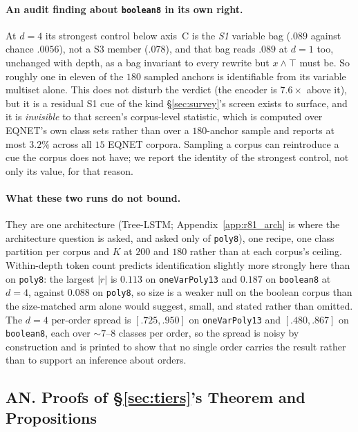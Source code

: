 \paragraph{An audit finding about \texttt{boolean8} in its own right.} At $d{=}4$ its strongest control below axis~C is the \emph{S1} variable bag ($.089$ against chance $.0056$), not a S3 member ($.078$), and that bag reads $.089$ at $d{=}1$ too, unchanged with depth, as a bag invariant to every rewrite but $x{\wedge}\top$ must be. So roughly one in eleven of the $180$ sampled anchors is identifiable from its variable multiset alone. This does not disturb the verdict (the encoder is $7.6\times$ above it), but it is a residual S1 cue of the kind \S\ref{sec:survey}'s screen exists to surface, and it is \emph{invisible} to that screen's corpus-level statistic, which is computed over EQNET's own class sets rather than over a $180$-anchor sample and reports at most $3.2\%$ across all $15$ EQNET corpora. Sampling a corpus can reintroduce a cue the corpus does not have; we report the identity of the strongest control, not only its value, for that reason.

\paragraph{What these two runs do not bound.} They are one architecture (Tree-LSTM; Appendix~\ref{app:r81_arch} is where the architecture question is asked, and asked only of \texttt{poly8}), one recipe, one class partition per corpus and $K$ at $200$ and $180$ rather than at each corpus's ceiling. Within-depth token count predicts identification slightly more strongly here than on \texttt{poly8}: the largest $|r|$ is $0.113$ on \texttt{oneVarPoly13} and $0.187$ on \texttt{boolean8} at $d{=}4$, against $0.088$ on \texttt{poly8}, so size is a weaker null on the boolean corpus than the size-matched arm alone would suggest, small, and stated rather than omitted. The $d{=}4$ per-order spread is $[.725,.950]$ on \texttt{oneVarPoly13} and $[.480,.867]$ on \texttt{boolean8}, each over ${\sim}7$--$8$ classes per order, so the spread is noisy by construction and is printed to show that no single order carries the result rather than to support an inference about orders.

\subsection*{AN. Proofs of \S\ref{sec:tiers}'s Theorem and Propositions}


